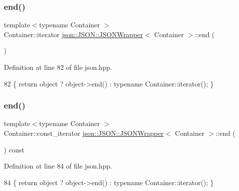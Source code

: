 \subsubsection{\texorpdfstring{end()}{end()}\hspace{0.1cm}{\footnotesize\ttfamily [1/2]}}
{\footnotesize\ttfamily template$<$typename Container $>$ \\
Container\+::iterator \mbox{\hyperlink{classjson_1_1_j_s_o_n_1_1_j_s_o_n_wrapper}{json\+::\+J\+S\+O\+N\+::\+J\+S\+O\+N\+Wrapper}}$<$ Container $>$\+::end (\begin{DoxyParamCaption}{ }\end{DoxyParamCaption})\hspace{0.3cm}{\ttfamily [inline]}}



Definition at line 82 of file json.\+hpp.


\begin{DoxyCode}
82 \{ \textcolor{keywordflow}{return} \textcolor{keywordtype}{object} ? \textcolor{keywordtype}{object}->end() : \textcolor{keyword}{typename} Container::iterator(); \}
\end{DoxyCode}
\mbox{\label{classjson_1_1_j_s_o_n_1_1_j_s_o_n_wrapper_a83cf121e6c6f45bdd9a69cb133a8c867}} 
\subsubsection{\texorpdfstring{end()}{end()}\hspace{0.1cm}{\footnotesize\ttfamily [2/2]}}
{\footnotesize\ttfamily template$<$typename Container $>$ \\
Container\+::const\+\_\+iterator \mbox{\hyperlink{classjson_1_1_j_s_o_n_1_1_j_s_o_n_wrapper}{json\+::\+J\+S\+O\+N\+::\+J\+S\+O\+N\+Wrapper}}$<$ Container $>$\+::end (\begin{DoxyParamCaption}{ }\end{DoxyParamCaption}) const\hspace{0.3cm}{\ttfamily [inline]}}



Definition at line 84 of file json.\+hpp.


\begin{DoxyCode}
84 \{ \textcolor{keywordflow}{return} \textcolor{keywordtype}{object} ? \textcolor{keywordtype}{object}->end() : \textcolor{keyword}{typename} Container::iterator(); \}
\end{DoxyCode}


